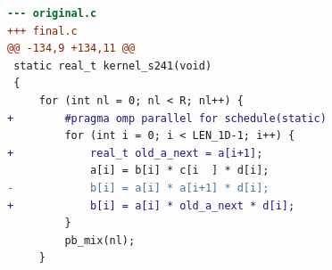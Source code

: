 \begin{lstlisting}[language=diff,basicstyle=\ttfamily\scriptsize,breaklines=true,caption={tsvc/s241 — BROKEN (e1_bare_a)}]
--- original.c
+++ final.c
@@ -134,9 +134,11 @@
 static real_t kernel_s241(void)
 {
     for (int nl = 0; nl < R; nl++) {
+        #pragma omp parallel for schedule(static)
         for (int i = 0; i < LEN_1D-1; i++) {
+            real_t old_a_next = a[i+1];
             a[i] = b[i] * c[i  ] * d[i];
-            b[i] = a[i] * a[i+1] * d[i];
+            b[i] = a[i] * old_a_next * d[i];
         }
         pb_mix(nl);
     }
\end{lstlisting}
